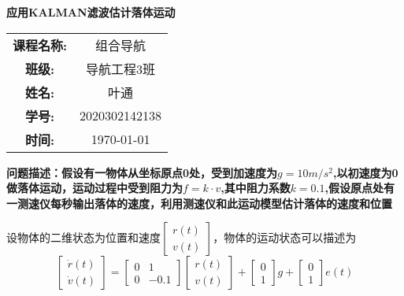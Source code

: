 \documentclass{ctexart}
\begin{document}
\begin{center}
\thispagestyle{empty}
\Large\textbf{应用KALMAN滤波估计落体运动}
\end{center}
\vfill
\begin{table}[h]
    \centering
    \large
    \begin{tabular}{cc}
    \textbf{课程名称:} & 组合导航 \\ \cline{2-2}
    \textbf{班级:} & 导航工程3班 \\ \cline{2-2}
    \textbf{姓名:} & 叶通 \\  \cline{2-2}
    \textbf{学号:} & 2020302142138 \\ \cline{2-2}
    \textbf{时间:} & \today \\ \cline{2-2}
    \end{tabular}
\end{table}

\newpage
\large\textbf{问题描述：假设有一物体从坐标原点0处，受到加速度为$g=10m/s^2$,以初速度为0做落体运动，运动过程中受到阻力为$f=k\cdot v$,其中阻力系数$k=0.1$,假设原点处有一测速仪每秒输出落体的速度，利用测速仪和此运动模型估计落体的速度和位置}

\vspace{2cm}
设物体的二维状态为位置和速度$\left[\begin{array}{c}r(t)\\v(t)\end{array}\right]$，物体的运动状态可以描述为
\begin{equation*}
\begin{bmatrix}
\dot{r}(t)\\
\dot{v}(t)\end{bmatrix}=\begin{bmatrix}
0&1\\
0&-0.1
\end{bmatrix}\begin{bmatrix}
r(t)\\
v(t)
\end{bmatrix}+\begin{bmatrix}
0\\
1
\end{bmatrix}g+\begin{bmatrix}
0\\
1
\end{bmatrix}e(t)
\end{equation*}
\end{document}
